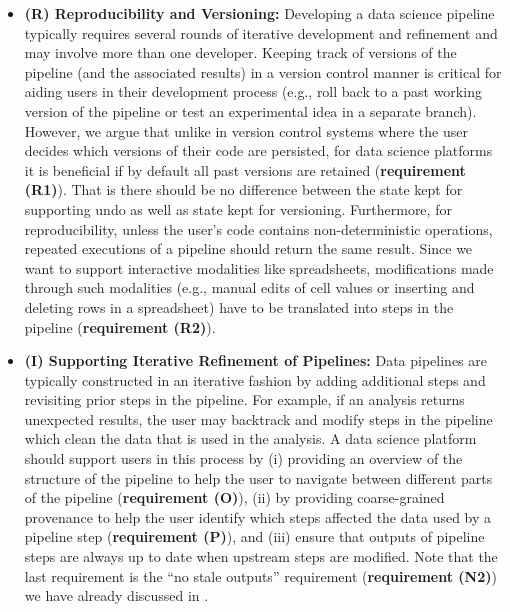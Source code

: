 \begin{itemize}
\item \textbf{(R) Reproducibility and Versioning:} Developing a data science pipeline typically requires several rounds of iterative development and refinement and may involve more than one developer. Keeping track of versions of the pipeline (and the associated results) in a version control manner is critical for aiding users in their development process (e.g., roll back to a past working version of the pipeline or test an experimental idea in a separate branch). However, we argue that unlike in version control systems where the user decides which versions of their code are persisted, for data science platforms it is beneficial if by default all past versions are retained (\textbf{requirement (R1)}). That is there should be no difference between the state kept for supporting undo as well as state kept for versioning. Furthermore, for reproducibility, unless the user's code contains non-deterministic operations, repeated executions of a pipeline should return the same result. Since we want to support interactive modalities like spreadsheets, modifications made through such modalities (e.g., manual edits of cell values or inserting and deleting rows in a spreadsheet) have to be translated into steps in the pipeline (\textbf{requirement (R2)}).
\item \textbf{(I) Supporting Iterative Refinement of Pipelines:} Data pipelines are typically constructed in an iterative fashion by adding additional steps and revisiting prior steps in the pipeline. For example, if an analysis returns unexpected results, the user may backtrack and modify steps in the pipeline which clean the data that is used in the analysis. A data science platform should support users in this process by (i) providing an overview of the structure of the pipeline to help the user to navigate between different parts of the pipeline (\textbf{requirement (O)}), (ii) by providing coarse-grained provenance to help the user identify which steps affected the data used by a pipeline step (\textbf{requirement (P)}), and (iii) ensure that outputs of pipeline steps are always up to date when upstream steps are modified. Note that the last requirement is the ``no stale outputs'' requirement (\textbf{requirement (N2)}) we have already discussed in .

\end{itemize}
